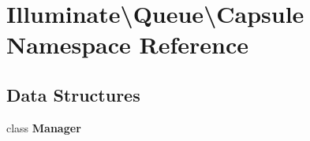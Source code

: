 \section{Illuminate\textbackslash{}Queue\textbackslash{}Capsule Namespace Reference}
\label{namespace_illuminate_1_1_queue_1_1_capsule}
\subsection*{Data Structures}
\begin{DoxyCompactItemize}
\item 
class {\bf Manager}
\end{DoxyCompactItemize}
